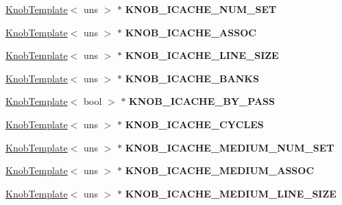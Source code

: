 \begin{DoxyCompactItemize}
\item 
\hypertarget{classall__knobs__c_a35b22d4d237c30a7ba9eeb87fe3dca74}{
\hyperlink{classKnobTemplate}{KnobTemplate}$<$ uns $>$ $\ast$ {\bfseries KNOB\_\-ICACHE\_\-NUM\_\-SET}}
\label{classall__knobs__c_a35b22d4d237c30a7ba9eeb87fe3dca74}

\item 
\hypertarget{classall__knobs__c_aa8897bec7d65b8bf89eeb0608311390b}{
\hyperlink{classKnobTemplate}{KnobTemplate}$<$ uns $>$ $\ast$ {\bfseries KNOB\_\-ICACHE\_\-ASSOC}}
\label{classall__knobs__c_aa8897bec7d65b8bf89eeb0608311390b}

\item 
\hypertarget{classall__knobs__c_a49aae061a3afd6f72afedf433e6cdb65}{
\hyperlink{classKnobTemplate}{KnobTemplate}$<$ uns $>$ $\ast$ {\bfseries KNOB\_\-ICACHE\_\-LINE\_\-SIZE}}
\label{classall__knobs__c_a49aae061a3afd6f72afedf433e6cdb65}

\item 
\hypertarget{classall__knobs__c_acff93dad928d3e3bba6915b058f4c19f}{
\hyperlink{classKnobTemplate}{KnobTemplate}$<$ uns $>$ $\ast$ {\bfseries KNOB\_\-ICACHE\_\-BANKS}}
\label{classall__knobs__c_acff93dad928d3e3bba6915b058f4c19f}

\item 
\hypertarget{classall__knobs__c_a918b6ac85f601efd798f6fc20c9f1b4d}{
\hyperlink{classKnobTemplate}{KnobTemplate}$<$ bool $>$ $\ast$ {\bfseries KNOB\_\-ICACHE\_\-BY\_\-PASS}}
\label{classall__knobs__c_a918b6ac85f601efd798f6fc20c9f1b4d}

\item 
\hypertarget{classall__knobs__c_a1f8a3eb1e28d49b37096c5e5116aec48}{
\hyperlink{classKnobTemplate}{KnobTemplate}$<$ uns $>$ $\ast$ {\bfseries KNOB\_\-ICACHE\_\-CYCLES}}
\label{classall__knobs__c_a1f8a3eb1e28d49b37096c5e5116aec48}

\item 
\hypertarget{classall__knobs__c_a96621696817c45417b974df6202faca5}{
\hyperlink{classKnobTemplate}{KnobTemplate}$<$ uns $>$ $\ast$ {\bfseries KNOB\_\-ICACHE\_\-MEDIUM\_\-NUM\_\-SET}}
\label{classall__knobs__c_a96621696817c45417b974df6202faca5}

\item 
\hypertarget{classall__knobs__c_aa71ce42eb46f34fb152ebe99d9ffa3b4}{
\hyperlink{classKnobTemplate}{KnobTemplate}$<$ uns $>$ $\ast$ {\bfseries KNOB\_\-ICACHE\_\-MEDIUM\_\-ASSOC}}
\label{classall__knobs__c_aa71ce42eb46f34fb152ebe99d9ffa3b4}

\item 
\hypertarget{classall__knobs__c_a2bd870791e4044c2c6dfbad3e79cd258}{
\hyperlink{classKnobTemplate}{KnobTemplate}$<$ uns $>$ $\ast$ {\bfseries KNOB\_\-ICACHE\_\-MEDIUM\_\-LINE\_\-SIZE}}
\label{classall__knobs__c_a2bd870791e4044c2c6dfbad3e79cd258}


\end{DoxyCompactItemize}
